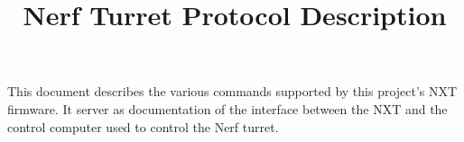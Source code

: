 \documentclass{article}
\title{Nerf Turret Protocol Description}
\author{}
\date{}
\begin{document}
	\maketitle

	This document describes the various commands supported by this project's NXT firmware.
	It server as documentation of the interface between the NXT and the control computer used to control the Nerf turret.
\end{document}
